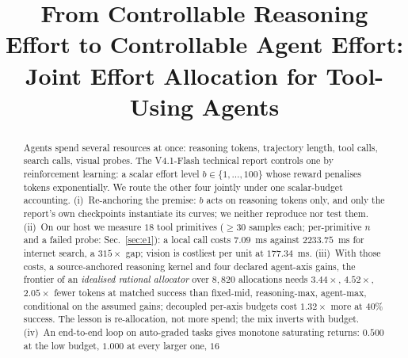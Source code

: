 \documentclass[10pt]{article} %
\title{From Controllable Reasoning Effort to Controllable Agent Effort:
Joint Effort Allocation for Tool-Using Agents}
\begin{document}
\maketitle

\begin{abstract}%
Agents spend several resources at once: reasoning tokens, trajectory
length, tool calls, search calls, visual probes. The V4.1-Flash technical report
controls one by reinforcement learning: a scalar effort level
$b\in\{1,\dots,100\}$ whose reward penalises tokens exponentially. We route the other four jointly under one
scalar-budget accounting. (i)~Re-anchoring the
premise: $b$ acts on reasoning tokens only, and only the report's own checkpoints
instantiate its curves; we neither reproduce nor test them. (ii)~On our host we
measure $18$ tool primitives ($\geq30$ samples each; per-primitive
$n$ and a failed probe: Sec.~\ref{sec:e1}): a local call costs
$7.09$~ms against $2233.75$~ms for internet search, a $315\times$ gap; vision is
costliest per unit at $177.34$~ms. (iii)~With those costs, a source-anchored
reasoning kernel and four declared agent-axis gains, the frontier of an \emph{idealised
rational allocator} over $8{,}820$ allocations needs $3.44\times$, $4.52\times$, $2.05\times$ fewer tokens at matched success than
fixed-mid, reasoning-max, agent-max, conditional on the assumed gains; decoupled per-axis budgets cost
$1.32\times$ more at $40\%$ success. The lesson is re-allocation, not more spend; the mix
inverts with budget. (iv)~An end-to-end loop on auto-graded tasks gives monotone
saturating returns: $0.500$ at the low budget, $1.000$ at every larger one, $16$

\end{abstract}
\end{document}
